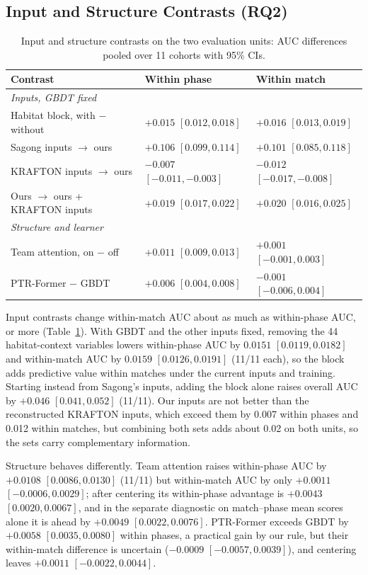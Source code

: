 \documentclass[sigconf,anonymous]{acmart}
\begin{document}
\subsection{Input and Structure Contrasts (RQ2)}
\label{sec:results:inputs}
\begin{table}[t]
\centering\scriptsize
\caption{Input and structure contrasts on the two evaluation units: AUC differences pooled over 11 cohorts with 95\% CIs.}
\label{tab:contrasts}
\setlength{\tabcolsep}{2.5pt}
\begin{tabular}{lll}
\toprule
Contrast & Within phase & Within match \\
\midrule
\multicolumn{3}{l}{\emph{Inputs, GBDT fixed}} \\
Habitat block, with $-$ without & $+0.015$ $[0.012, 0.018]$ & $+0.016$ $[0.013, 0.019]$ \\
Sagong inputs $\to$ ours & $+0.106$ $[0.099, 0.114]$ & $+0.101$ $[0.085, 0.118]$ \\
KRAFTON inputs $\to$ ours & $-0.007$ $[-0.011, -0.003]$ & $-0.012$ $[-0.017, -0.008]$ \\
Ours $\to$ ours + KRAFTON inputs & $+0.019$ $[0.017, 0.022]$ & $+0.020$ $[0.016, 0.025]$ \\
\midrule
\multicolumn{3}{l}{\emph{Structure and learner}} \\
Team attention, on $-$ off & $+0.011$ $[0.009, 0.013]$ & $+0.001$ $[-0.001, 0.003]$ \\
PTR-Former $-$ GBDT & $+0.006$ $[0.004, 0.008]$ & $-0.001$ $[-0.006, 0.004]$ \\
\bottomrule
\end{tabular}
\end{table}
Input contrasts change within-match AUC about as much as within-phase AUC, or more (Table~\ref{tab:contrasts}). With GBDT and the other inputs fixed, removing the 44 habitat-context variables lowers within-phase AUC by $0.0151$ $[0.0119,\allowbreak 0.0182]$ and within-match AUC by $0.0159$ $[0.0126,\allowbreak 0.0191]$ (11/11 each), so the block adds predictive value within matches under the current inputs and training. Starting instead from Sagong's inputs, adding the block alone raises overall AUC by $+0.046$ $[0.041,\allowbreak 0.052]$ (11/11). Our inputs are not better than the reconstructed KRAFTON inputs, which exceed them by 0.007 within phases and 0.012 within matches, but combining both sets adds about 0.02 on both units, so the sets carry complementary information.

Structure behaves differently. Team attention raises within-phase AUC by $+0.0108$ $[0.0086,\allowbreak 0.0130]$ (11/11) but within-match AUC by only $+0.0011$ $[-0.0006,\allowbreak 0.0029]$; after centering its within-phase advantage is $+0.0043$ $[0.0020,\allowbreak 0.0067]$, and in the separate diagnostic on match--phase mean scores alone it is ahead by $+0.0049$ $[0.0022,\allowbreak 0.0076]$. PTR-Former exceeds GBDT by $+0.0058$ $[0.0035,\allowbreak 0.0080]$ within phases, a practical gain by our rule, but their within-match difference is uncertain ($-0.0009$ $[-0.0057,\allowbreak 0.0039]$), and centering leaves $+0.0011$ $[-0.0022,\allowbreak 0.0044]$.
\end{document}

